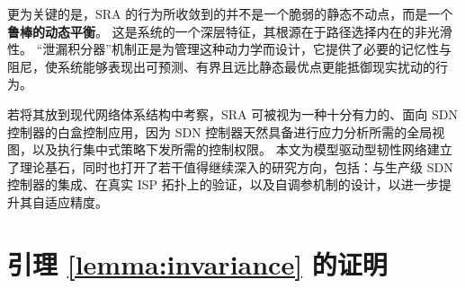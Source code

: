 \documentclass[journal]{IEEEtran}
\theoremstyle{plain}
\theoremstyle{definition}
\begin{document}
更为关键的是，SRA 的行为所收敛到的并不是一个脆弱的静态不动点，而是一个\textbf{鲁棒的动态平衡}。
这是系统的一个深层特征，其根源在于路径选择内在的非光滑性。
“泄漏积分器”机制正是为管理这种动力学而设计，它提供了必要的记忆性与阻尼，使系统能够表现出可预测、有界且远比静态最优点更能抵御现实扰动的行为。

若将其放到现代网络体系结构中考察，SRA 可被视为一种十分有力的、面向 SDN 控制器的白盒控制应用，因为 SDN 控制器天然具备进行应力分析所需的全局视图，以及执行集中式策略下发所需的控制权限。
本文为模型驱动型韧性网络建立了理论基石，同时也打开了若干值得继续深入的研究方向，包括：与生产级 SDN 控制器的集成、在真实 ISP 拓扑上的验证，以及自调参机制的设计，以进一步提升其自适应精度。






\appendices
\section{引理 \ref{lemma:invariance} 的证明}
\label{app:proof_lemma_invariance}
\end{document}
